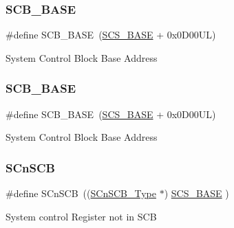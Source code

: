 \subsubsection{\texorpdfstring{S\+C\+B\+\_\+\+B\+A\+SE}{SCB\_BASE}\hspace{0.1cm}{\footnotesize\ttfamily [11/12]}}
{\footnotesize\ttfamily \#define S\+C\+B\+\_\+\+B\+A\+SE~(\hyperlink{group___c_m_s_i_s__core__base_ga3c14ed93192c8d9143322bbf77ebf770}{S\+C\+S\+\_\+\+B\+A\+SE} +  0x0\+D00\+U\+L)}

System Control Block Base Address \mbox{\label{group___c_m_s_i_s__core__base_gad55a7ddb8d4b2398b0c1cfec76c0d9fd}} 
\subsubsection{\texorpdfstring{S\+C\+B\+\_\+\+B\+A\+SE}{SCB\_BASE}\hspace{0.1cm}{\footnotesize\ttfamily [12/12]}}
{\footnotesize\ttfamily \#define S\+C\+B\+\_\+\+B\+A\+SE~(\hyperlink{group___c_m_s_i_s__core__base_ga3c14ed93192c8d9143322bbf77ebf770}{S\+C\+S\+\_\+\+B\+A\+SE} +  0x0\+D00\+U\+L)}

System Control Block Base Address \mbox{\label{group___c_m_s_i_s__core__base_ga9fe0cd2eef83a8adad94490d9ecca63f}} 
\subsubsection{\texorpdfstring{S\+Cn\+S\+CB}{SCnSCB}\hspace{0.1cm}{\footnotesize\ttfamily [1/8]}}
{\footnotesize\ttfamily \#define S\+Cn\+S\+CB~((\hyperlink{struct_s_cn_s_c_b___type}{S\+Cn\+S\+C\+B\+\_\+\+Type}    $\ast$)     \hyperlink{group___c_m_s_i_s__core__base_ga3c14ed93192c8d9143322bbf77ebf770}{S\+C\+S\+\_\+\+B\+A\+SE}      )}

System control Register not in S\+CB \mbox{\label{group___c_m_s_i_s__core__base_ga9fe0cd2eef83a8adad94490d9ecca63f}} 
